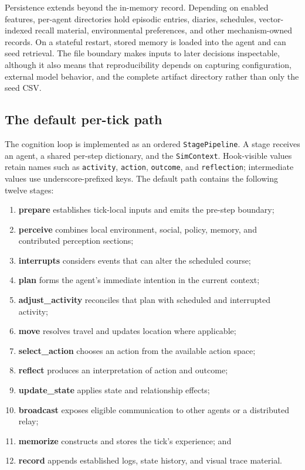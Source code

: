 Persistence extends beyond the in-memory record.  Depending on enabled
features, per-agent directories hold episodic entries, diaries, schedules,
vector-indexed recall material, environmental preferences, and other
mechanism-owned records.  On a stateful restart, stored memory is loaded into
the agent and can seed retrieval.  The file boundary makes inputs to later
decisions inspectable, although it also means that reproducibility depends on
capturing configuration, external model behavior, and the complete artifact
directory rather than only the seed CSV.

\subsection{The default per-tick path}

The cognition loop is implemented as an ordered \texttt{StagePipeline}.  A
stage receives an agent, a shared per-step dictionary, and the
\texttt{SimContext}.  Hook-visible values retain names such as
\texttt{activity}, \texttt{action}, \texttt{outcome}, and
\texttt{reflection}; intermediate values use underscore-prefixed keys.  The
default path contains the following twelve stages:

\begin{enumerate}[leftmargin=*,label=\arabic*.]
  \item \textbf{prepare} establishes tick-local inputs and emits the pre-step
  boundary;
  \item \textbf{perceive} combines local environment, social, policy, memory,
  and contributed perception sections;
  \item \textbf{interrupts} considers events that can alter the scheduled
  course;
  \item \textbf{plan} forms the agent's immediate intention in the current
  context;
  \item \textbf{adjust\_activity} reconciles that plan with scheduled and
  interrupted activity;
  \item \textbf{move} resolves travel and updates location where applicable;
  \item \textbf{select\_action} chooses an action from the available action
  space;
  \item \textbf{reflect} produces an interpretation of action and outcome;
  \item \textbf{update\_state} applies state and relationship effects;
  \item \textbf{broadcast} exposes eligible communication to other agents or
  a distributed relay;
  \item \textbf{memorize} constructs and stores the tick's experience; and
  \item \textbf{record} appends established logs, state history, and visual
  trace material.
\end{enumerate}

